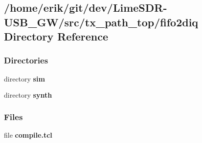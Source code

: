 \subsection{/home/erik/git/dev/\+Lime\+S\+D\+R-\/\+U\+S\+B\+\_\+\+G\+W/src/tx\+\_\+path\+\_\+top/fifo2diq Directory Reference}
\label{dir_2470ddd61b608e0bda73d0a7b168b3a5}
\subsubsection*{Directories}
\begin{DoxyCompactItemize}
\item 
directory {\bf sim}
\item 
directory {\bf synth}
\end{DoxyCompactItemize}
\subsubsection*{Files}
\begin{DoxyCompactItemize}
\item 
file {\bf compile.\+tcl}
\end{DoxyCompactItemize}
